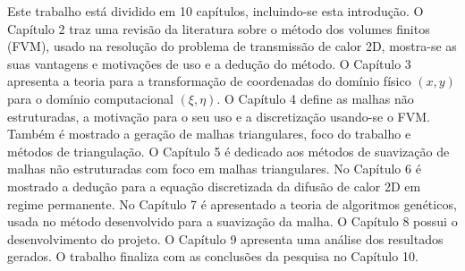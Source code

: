 Este trabalho está dividido em 10 capítulos, incluindo-se esta introdução.
O Capítulo 2 traz uma revisão da literatura sobre o método dos volumes finitos (FVM), usado na resolução do problema de transmissão de calor 2D, mostra-se as suas vantagens e motivações de uso e a dedução do método.
O Capítulo 3 apresenta a teoria para a transformação de coordenadas do domínio físico $(x,y)$ para o domínio computacional $(\xi,\eta)$.
O Capítulo 4 define as malhas não estruturadas, a motivação para o seu uso e a discretização usando-se o FVM. Também é mostrado a geração de malhas triangulares, foco do trabalho e métodos de triangulação.
O Capítulo 5 é dedicado aos métodos de suavização de malhas não estruturadas com foco em malhas triangulares.
No Capítulo 6 é mostrado a dedução para a equação discretizada da difusão de calor 2D em regime permanente.
No Capítulo 7 é apresentado a teoria de algoritmos genéticos, usada no método desenvolvido para a suavização da malha.
O Capítulo 8 possui o desenvolvimento do projeto.
O Capítulo 9 apresenta uma análise dos resultados gerados.
O trabalho finaliza com as conclusões da pesquisa no Capítulo 10.




  






